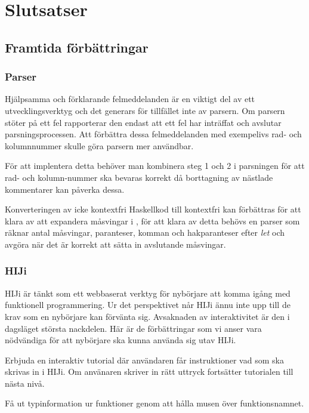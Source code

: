 \section{Slutsatser}

\subsection{Framtida förbättringar}


\subsubsection{Parser}
Hjälpsamma och förklarande felmeddelanden är en viktigt del av ett utvecklingsverktyg och det generars för tillfället inte av parsern. 
Om parsern stöter på ett fel rapporterar den endast att ett fel har inträffat och avslutar parsningsprocessen. 
Att förbättra dessa felmeddelanden med exempelivs rad- och kolumnnummer skulle göra parsern mer användbar.

För att implentera detta behöver man kombinera steg 1 och 2 i parsningen för att rad- och kolumn-nummer ska bevaras korrekt då borttagning av nästlade kommentarer kan påverka dessa.

Konverteringen av icke kontextfri Haskellkod till kontextfri kan förbättras 
för att klara av att expandera måsvingar i \empth{[x | let x = 5]}, 
för att klara av detta behövs en parser som räknar antal måsvingar, paranteser, 
komman och hakparanteser efter \emph{let} och avgöra när det är korrekt att sätta in avslutande måsvingar.

\subsubsection{HIJi}
HIJi är tänkt som ett webbaserat verktyg för nybörjare att komma igång med funktionell programmering. Ur det perspektivet når HIJi ännu inte upp till de krav som en nybörjare kan förvänta sig. Avsaknaden av interaktivitet är den i dagsläget största nackdelen. Här är de förbättringar som vi anser vara nödvändiga för att nybörjare ska kunna använda sig utav HIJi.

Erbjuda en interaktiv tutorial där användaren får instruktioner vad som ska skrivas in i HIJi. Om använaren skriver in rätt uttryck fortsätter tutorialen till nästa nivå.

Få ut typinformation ur funktioner genom att hålla musen över funktionsnamnet. 
